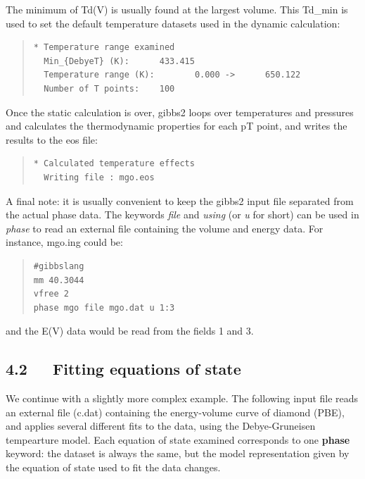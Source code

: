 \documentclass[a4paper]{article}
\begin{document}
The minimum of Td(V) is usually found at the largest volume. This
Td\_min is used to set the default temperature datasets used in the
dynamic calculation:
%
\begin{quote}
\begin{verbatim}
* Temperature range examined
  Min_{DebyeT} (K):      433.415
  Temperature range (K):        0.000 ->      650.122
  Number of T points:    100
\end{verbatim}
\end{quote}

Once the static calculation is over, gibbs2 loops over temperatures
and pressures and calculates the thermodynamic properties for each pT
point, and writes the results to the eos file:
%
\begin{quote}
\begin{verbatim}
* Calculated temperature effects
  Writing file : mgo.eos
\end{verbatim}
\end{quote}

A final note: it is usually convenient to keep the gibbs2 input file
separated from the actual phase data. The keywords \emph{file} and \emph{using}
(or \emph{u} for short) can be used in \emph{phase} to read an external file
containing the volume and energy data. For instance, mgo.ing could be:
%
\begin{quote}
\begin{verbatim}
#gibbslang
mm 40.3044
vfree 2
phase mgo file mgo.dat u 1:3
\end{verbatim}
\end{quote}

and the E(V) data would be read from the fields 1 and 3.


\subsection{4.2~~~Fitting equations of state%
  \label{fitting-equations-of-state}%
}

We continue with a slightly more complex example. The following input
file reads an external file (c.dat) containing the energy-volume curve
of diamond (PBE), and applies several different fits to the
data, using the Debye-Gruneisen tempearture model. Each equation of
state examined corresponds to one \textbf{phase} keyword: the dataset is
always the same, but the model representation given by the equation of
state used to fit the data changes.
\end{document}
